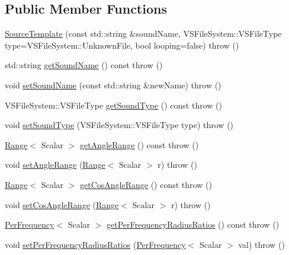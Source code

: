 \subsection*{Public Member Functions}
\begin{DoxyCompactItemize}
\item 
\hyperlink{classAudio_1_1SourceTemplate_a5b7f98e2ac7d948a90852dfbec636de9}{Source\+Template} (const std\+::string \&sound\+Name, V\+S\+File\+System\+::\+V\+S\+File\+Type type=V\+S\+File\+System\+::\+Unknown\+File, bool looping=false)  throw ()
\item 
std\+::string \hyperlink{classAudio_1_1SourceTemplate_a3c2742afdd174800d18af2acc398b022}{get\+Sound\+Name} () const   throw ()
\item 
void \hyperlink{classAudio_1_1SourceTemplate_a1e70f53912da8ad647fd8dcef1a8f368}{set\+Sound\+Name} (const std\+::string \&new\+Name)  throw ()
\item 
V\+S\+File\+System\+::\+V\+S\+File\+Type \hyperlink{classAudio_1_1SourceTemplate_a5829d1ec32f75dd20fd69a811e690ac7}{get\+Sound\+Type} () const   throw ()
\item 
void \hyperlink{classAudio_1_1SourceTemplate_a6b1dacc381fb5c9d4e6beb3033000457}{set\+Sound\+Type} (V\+S\+File\+System\+::\+V\+S\+File\+Type type)  throw ()
\item 
\hyperlink{structAudio_1_1Range}{Range}$<$ Scalar $>$ \hyperlink{classAudio_1_1SourceTemplate_afcbec57262895a6c5e9885aab4662e6f}{get\+Angle\+Range} () const   throw ()
\item 
void \hyperlink{classAudio_1_1SourceTemplate_aadc97f5080adf1cbb15f20d061d0e397}{set\+Angle\+Range} (\hyperlink{structAudio_1_1Range}{Range}$<$ Scalar $>$ r)  throw ()
\item 
\hyperlink{structAudio_1_1Range}{Range}$<$ Scalar $>$ \hyperlink{classAudio_1_1SourceTemplate_a54a2abd999f613f635c9b9d901aa4fea}{get\+Cos\+Angle\+Range} () const   throw ()
\item 
void \hyperlink{classAudio_1_1SourceTemplate_af93314a3fc44556f9f9299914181d665}{set\+Cos\+Angle\+Range} (\hyperlink{structAudio_1_1Range}{Range}$<$ Scalar $>$ r)  throw ()
\item 
\hyperlink{structAudio_1_1PerFrequency}{Per\+Frequency}$<$ Scalar $>$ \hyperlink{classAudio_1_1SourceTemplate_a32d443597eac6996201ba1d07a770b4f}{get\+Per\+Frequency\+Radius\+Ratios} () const   throw ()
\item 
void \hyperlink{classAudio_1_1SourceTemplate_aaf4c561a7c143dc1324e78b32e4d9cc2}{set\+Per\+Frequency\+Radius\+Ratios} (\hyperlink{structAudio_1_1PerFrequency}{Per\+Frequency}$<$ Scalar $>$ val)  throw ()

\end{DoxyCompactItemize}
